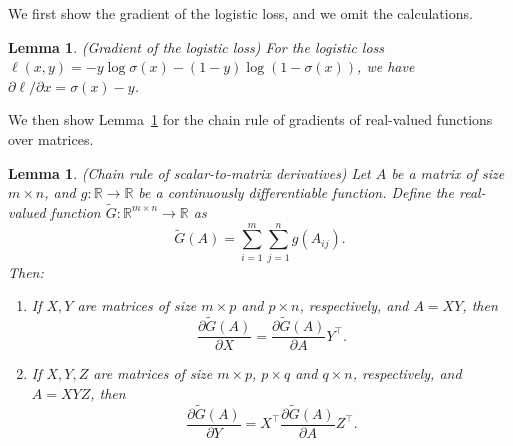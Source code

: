 \documentclass{article}
\newcommand{\RR}{\mathbb{R}}
\theoremstyle{plain}
\newtheorem{lemma}[theorem]{Lemma}
\begin{document}
We first show the gradient of the logistic loss, and we omit the calculations. 
\begin{lemma}(Gradient of the logistic loss)
	\label{lem:gradient-of-log-loss}
	For the logistic loss $\ell(x, y) = -y \log \sigma(x) - (1 - y) \log (1 - \sigma(x))$, we have $\partial \ell / \partial x = \sigma(x) - y$.
\end{lemma}

We then show Lemma~\ref{lem:gradient-of-scalar-to-matrix} for the chain rule of gradients of real-valued functions over matrices.
\begin{lemma}(Chain rule of scalar-to-matrix derivatives)
	\label{lem:gradient-of-scalar-to-matrix}
	Let $A$ be a matrix of size $m \times n$, and $g: \RR \rightarrow \RR$ be a continuously differentiable function.
	Define the real-valued function $\tilde{G}: \RR^{m \times n} \rightarrow \RR$ as 
	\begin{equation}
		\tilde{G}(A) = \sum_{i=1}^m \sum_{j=1}^n g(A_{ij}).
		\nonumber
	\end{equation}
	Then:
	\begin{enumerate}
		\item If $X, Y$ are matrices of size $m \times p$ and $p \times n$, respectively, and $A = X Y$, then 
		\begin{equation}
			\frac{\partial \tilde{G}(A)}{\partial X} = \frac{\partial \tilde{G}(A)}{\partial A} Y^\top.
			\nonumber
		\end{equation}
		\item If $X, Y, Z$ are matrices of size $m \times p$, $p \times q$ and $q \times n$, respectively, and $A = X Y Z$, then 
		\begin{equation}
			\frac{\partial \tilde{G}(A)}{\partial Y} = X^\top \frac{\partial \tilde{G}(A)}{\partial A} Z^\top.
			\nonumber
		\end{equation} 
	\end{enumerate}
\end{lemma}
\end{document}
